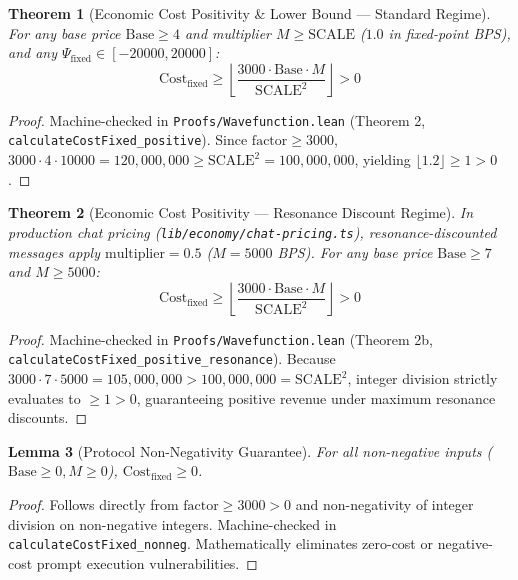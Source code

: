 \documentclass[11pt,a4paper]{article}
\theoremstyle{plain}
\newtheorem{theorem}{Theorem}[section]
\newtheorem{lemma}[theorem]{Lemma}
\theoremstyle{definition}
\theoremstyle{remark}
\begin{document}
\begin{theorem}[Economic Cost Positivity \& Lower Bound --- Standard Regime]
\label{thm:cost_positive}
For any base price $\text{Base} \ge 4$ and multiplier $M \ge \text{SCALE}$ ($1.0$ in fixed-point BPS), and any $\Psi_{\text{fixed}} \in [-20000, 20000]$:
\begin{equation}
    \text{Cost}_{\text{fixed}} \ge \left\lfloor \frac{3000 \cdot \text{Base} \cdot M}{\text{SCALE}^2} \right\rfloor > 0
\end{equation}
\end{theorem}
\begin{proof}
Machine-checked in \texttt{Proofs/Wavefunction.lean} (Theorem 2, \texttt{calculateCostFixed\_positive}). Since $\text{factor} \ge 3000$, $3000 \cdot 4 \cdot 10000 = 120,000,000 \ge \text{SCALE}^2 = 100,000,000$, yielding $\lfloor 1.2 \rfloor \ge 1 > 0$.
\end{proof}

\begin{theorem}[Economic Cost Positivity --- Resonance Discount Regime]
\label{thm:cost_positive_resonance}
In production chat pricing (\texttt{lib/economy/chat-pricing.ts}), resonance-discounted messages apply $\text{multiplier} = 0.5$ ($M = 5000$ BPS). For any base price $\text{Base} \ge 7$ and $M \ge 5000$:
\begin{equation}
    \text{Cost}_{\text{fixed}} \ge \left\lfloor \frac{3000 \cdot \text{Base} \cdot M}{\text{SCALE}^2} \right\rfloor > 0
\end{equation}
\end{theorem}
\begin{proof}
Machine-checked in \texttt{Proofs/Wavefunction.lean} (Theorem 2b, \texttt{calculateCostFixed\_positive\_resonance}). Because $3000 \cdot 7 \cdot 5000 = 105,000,000 > 100,000,000 = \text{SCALE}^2$, integer division strictly evaluates to $\ge 1 > 0$, guaranteeing positive revenue under maximum resonance discounts.
\end{proof}

\begin{lemma}[Protocol Non-Negativity Guarantee]
\label{lem:cost_nonneg}
For all non-negative inputs ($\text{Base} \ge 0, M \ge 0$), $\text{Cost}_{\text{fixed}} \ge 0$.
\end{lemma}
\begin{proof}
Follows directly from $\text{factor} \ge 3000 > 0$ and non-negativity of integer division on non-negative integers. Machine-checked in \texttt{calculateCostFixed\_nonneg}. Mathematically eliminates zero-cost or negative-cost prompt execution vulnerabilities.
\end{proof}
\end{document}
